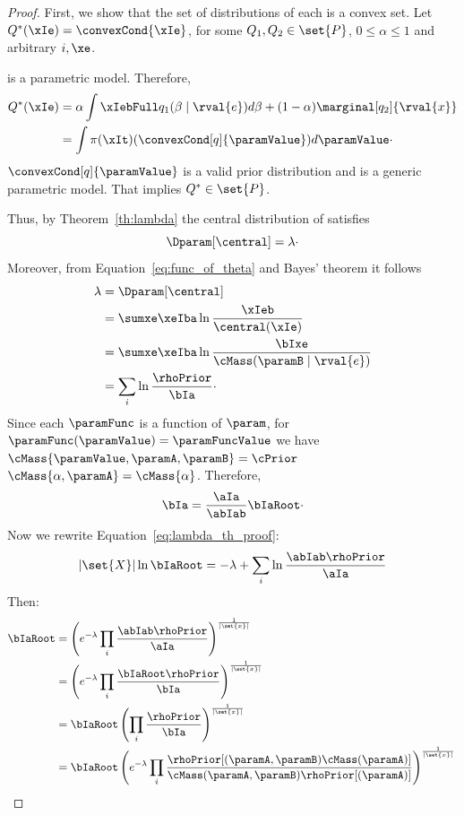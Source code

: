 \begin{proof}
    First, we show that the set of distributions of each \Qvar is a convex set.
    Let $Q^*(\xIe) = \convexCond{\xIe}$, for some $Q_1, Q_2 \in \set{P}$, $0 \leq \alpha \leq 1$ and
    arbitrary $i, \xe$.

    \Mt is a parametric model.
    Therefore,
    \begin{align*}
        Q^*(\xIe) &= \alpha \int \xIebFull q_1(\beta \mid \rval {e}) d\beta + (1 - \alpha) \marginal[q_2]{\rval{x}}\\
        &= \int \pi(\xIt) (\convexCond[q]{\paramValue}) d\paramValue\cdot
    \end{align*}
    $\convexCond[q]{\paramValue}$ is a valid prior distribution and \Mt is a generic parametric model.
    That implies $Q^* \in \set{P}$.

    Thus, by Theorem~\ref{th:lambda} the central distribution of  satisfies
    \begin{equation}
        \Dparam[\central] = \lambda\cdot
        \label{eq:lambda_th_proof}
    \end{equation}
    Moreover, from Equation~\ref{eq:func_of_theta} and Bayes' theorem it follows
    \begin{align*}
        \lambda
        &= \Dparam[\central]\\
        &= \sumxe \xeIba \ln \frac{\xIeb}{\central(\xIe)} \\
        &= \sumxe \xeIba \ln \frac{\bIxe}{\cMass(\paramB \mid \rval{e})} \\
        &= \sum_i \ln \frac{\rhoPrior}{\bIa}\cdot
    \end{align*}
    Since each $\paramFunc$ is a function of $\param$, for $\paramFunc(\paramValue) = \paramFuncValue$
    we have $\cMass{\paramValue, \paramA, \paramB}=\cPrior$ $\cMass{\alpha , \paramA} = \cMass{\alpha}$.
    Therefore,
    \begin{equation*}
        \bIa = \frac{\aIa}{\abIab} \bIaRoot \cdot
    \end{equation*}
    Now we rewrite Equation~\ref{eq:lambda_th_proof}:
    \[
        |\set{X}| \ln \bIaRoot = -\lambda + \sum_i \ln \frac{\abIab \rhoPrior}{\aIa}
    \]
    Then:
    \begin{align*}
        \bIaRoot
        &= \left( e^{-\lambda} \prod_i \frac{\abIab \rhoPrior}{\aIa} \right)^{\frac{1}{|\set{x}|}} \\
        &= \left( e^{-\lambda} \prod_i \frac{\bIaRoot \rhoPrior}{\bIa} \right)^{\frac{1}{|\set{x}|}} \\
        &= \bIaRoot \left( \prod_i \frac{ \rhoPrior}{\bIa} \right)^{\frac{1}{|\set{x}|}} \\
        &= \bIaRoot \left(e^{-\lambda} \prod_i
        \frac{\rhoPrior[(\paramA, \paramB) \cMass(\paramA)]}{\cMass(\paramA, \paramB) \rhoPrior[(\paramA)] } \right)
        ^{\frac{1
        }{|\set{x}|}}
        \qedhere
    \end{align*}
\end{proof}






